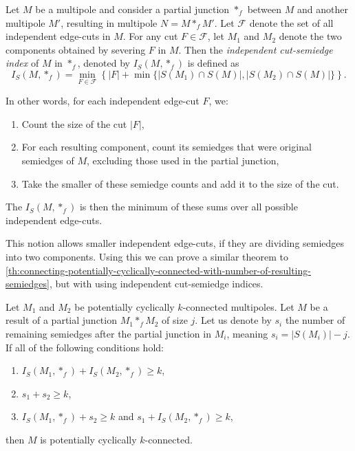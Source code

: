 \documentclass[12pt, twoside]{book}
\begin{document}
\begin{definition}
	Let $M$ be a multipole and consider a partial junction $*_f$ between $M$ and another multipole $M'$, resulting in multipole $N=M*_fM'$.  Let $\mathcal{F}$ denote the set of all independent edge-cuts in $M$. For any cut $F\in\mathcal{F}$, let $M_1$ and $M_2$ denote the two components obtained by severing $F$ in $M$. Then the \textit{independent cut-semiedge index} of $M$ in $*_f$, denoted by $I_S(M, *_f)$ is defined as
	$$I_S(M, *_f)=\min\limits_{F\in\mathcal{F}} \left\{|F|+\min\{|S(M_1)\cap S(M)|, |S(M_2)\cap S(M)|\}\right\}.$$
\end{definition}

In other words, for each independent edge-cut $F$, we:
\begin{enumerate}
	\item Count the size of the cut $|F|$,
	\item For each resulting component, count its semiedges that were original semiedges of $M$, excluding those used in the partial junction,
	\item Take the smaller of these semiedge counts and add it to the size of the cut.
\end{enumerate}
The $I_S(M, *_f)$ is then the minimum of these sums over all possible independent edge-cuts.

This notion allows smaller independent edge-cuts, if they are dividing semiedges into two components. Using this we can prove a similar theorem to \cref{th:connecting-potentially-cyclically-connected-with-number-of-resulting-semiedges}, but with using independent cut-semiedge indices.

\begin{theorem}\label{th:potentially-cyclically-connected-independent-semiedge-index}
	Let $M_1$ and $M_2$ be potentially cyclically $k$-connected multipoles. Let $M$ be a result of a partial junction $M_1*_fM_2$ of size $j$. Let us denote by $s_i$ the number of remaining semiedges after the partial junction in $M_i$, meaning ${s_i=|S(M_i)|-j}$. If all of the following conditions hold:
	\begin{enumerate}[label=(\roman*)]
		\item $I_S(M_1, *_f)+I_S(M_2, *_f)\geq k$,
		\item $s_1+s_2\geq k$,
		\item $I_S(M_1, *_f)+s_2\geq k$ and $s_1+I_S(M_2, *_f)\geq k$,
	\end{enumerate}
	then $M$ is potentially cyclically $k$-connected.
\end{theorem}
\end{document}
